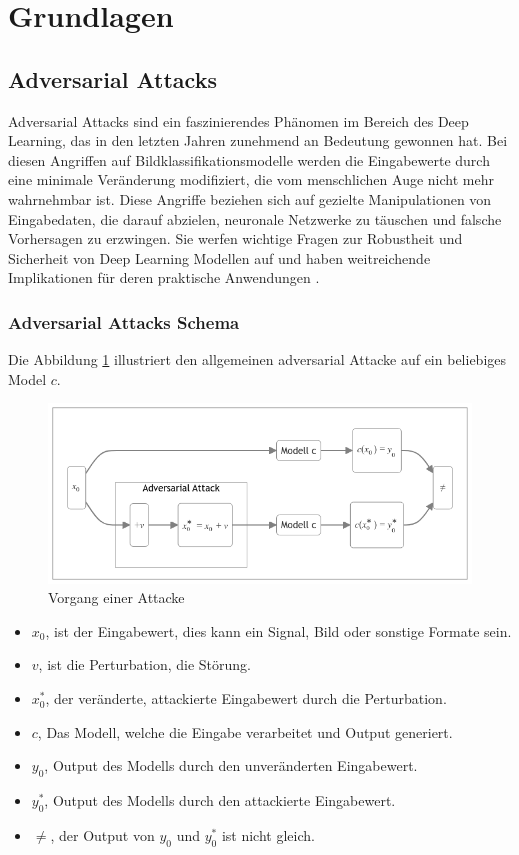 \section{Grundlagen} 
\subsection{Adversarial Attacks}

Adversarial Attacks sind ein faszinierendes Phänomen im Bereich des Deep Learning, das in den letzten Jahren zunehmend an Bedeutung gewonnen hat. Bei diesen Angriffen auf Bildklassifikationsmodelle werden die Eingabewerte durch eine minimale Veränderung modifiziert, die vom menschlichen Auge nicht mehr wahrnehmbar ist. Diese Angriffe beziehen sich auf gezielte Manipulationen von Eingabedaten, die darauf abzielen, neuronale Netzwerke zu täuschen und falsche Vorhersagen zu erzwingen. Sie werfen wichtige Fragen zur Robustheit und Sicherheit von Deep Learning Modellen auf und haben weitreichende Implikationen für deren praktische Anwendungen \cite{goodfellow_explaining_2015}. 

\subsubsection{Adversarial Attacks Schema} 

Die Abbildung \ref{fig:grundlagen} illustriert den allgemeinen adversarial Attacke auf ein beliebiges Model $c$. 

\begin{figure}[H]
    \centering
    \includegraphics[width=0.8\linewidth]{01-images/02-grundlagen/adversarial-attack.png}
    \caption{Vorgang einer Attacke}
    \label{fig:grundlagen}
\end{figure}

\begin{itemize}
    \item $x_0$, ist der Eingabewert, dies kann ein Signal, Bild oder sonstige Formate sein.
    \item $v$, ist die Perturbation, die Störung.
    \item $x_0^{*}$, der veränderte, attackierte Eingabewert durch die Perturbation.
    \item $c$, Das Modell, welche die Eingabe verarbeitet und Output generiert.
    \item $y_0$, Output des Modells durch den unveränderten Eingabewert.
    \item $y_0^{*}$, Output des Modells durch den attackierte Eingabewert.
    \item $\neq$, der Output von $y_0$ und $y_0^{*}$ ist nicht gleich.
\end{itemize}

